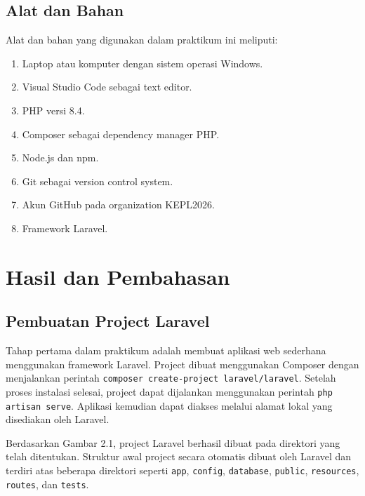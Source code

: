 \documentclass[a4paper,oneside,11pt]{book}
\begin{document}
\section{Alat dan Bahan}
Alat dan bahan yang digunakan dalam praktikum ini meliputi:
\begin{enumerate}
    \item Laptop atau komputer dengan sistem operasi Windows.
    \item Visual Studio Code sebagai text editor.
    \item PHP versi 8.4.
    \item Composer sebagai dependency manager PHP.
    \item Node.js dan npm.
    \item Git sebagai version control system.
    \item Akun GitHub pada organization KEPL2026.
    \item Framework Laravel.
\end{enumerate}

\chapter{Hasil dan Pembahasan}

\section{Pembuatan Project Laravel}

Tahap pertama dalam praktikum adalah membuat aplikasi web sederhana menggunakan framework Laravel. Project dibuat menggunakan Composer dengan menjalankan perintah \texttt{composer create-project laravel/laravel}. Setelah proses instalasi selesai, project dapat dijalankan menggunakan perintah \texttt{php artisan serve}. Aplikasi kemudian dapat diakses melalui alamat lokal yang disediakan oleh Laravel.


Berdasarkan Gambar 2.1, project Laravel berhasil dibuat pada direktori yang telah ditentukan. Struktur awal project secara otomatis dibuat oleh Laravel dan terdiri atas beberapa direktori seperti \texttt{app}, \texttt{config}, \texttt{database}, \texttt{public}, \texttt{resources}, \texttt{routes}, dan \texttt{tests}.
\end{document}
